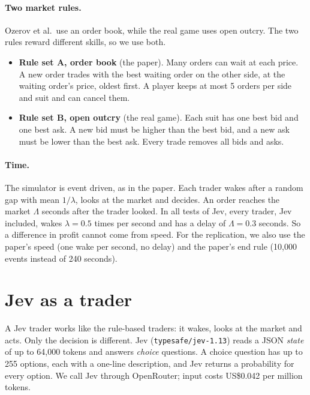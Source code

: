 \documentclass[10pt]{article}
\begin{document}
\paragraph{Two market rules.} Ozerov et al.\ use an order book, while the real game uses open outcry. The two rules
reward different skills, so we use both.
\begin{itemize}
\item \textbf{Rule set A, order book} (the paper). Many orders can wait at each price. A new order trades with the best
waiting order on the other side, at the waiting order's price, oldest first. A player keeps at most 5 orders per side
and suit and can cancel them.
\item \textbf{Rule set B, open outcry} (the real game). Each suit has one best bid and one best ask. A new bid must be
higher than the best bid, and a new ask must be lower than the best ask. Every trade removes all bids and asks.
\end{itemize}

\paragraph{Time.} The simulator is event driven, as in the paper. Each trader wakes after a random gap with mean
$1/\lambda$, looks at the market and decides. An order reaches the market $\Lambda$ seconds after the trader looked.
In all tests of Jev, every trader, Jev included, wakes $\lambda = 0.5$ times per second and has a delay of
$\Lambda = 0.3$ seconds. So a difference in profit cannot come from speed. For the replication, we also use the
paper's speed (one wake per second, no delay) and the paper's end rule (10,000 events instead of 240 seconds).

\section{Jev as a trader}\label{sec:jev}

A Jev trader works like the rule-based traders: it wakes, looks at the market and acts. Only the decision is
different. Jev (\texttt{typesafe/jev-1.13}) reads a JSON \emph{state} of up to 64,000 tokens and answers \emph{choice} questions.
A choice question has up to 255 options, each with a one-line description, and Jev returns a probability for every
option. We call Jev through OpenRouter; input costs US\$0.042 per million tokens.
\end{document}
